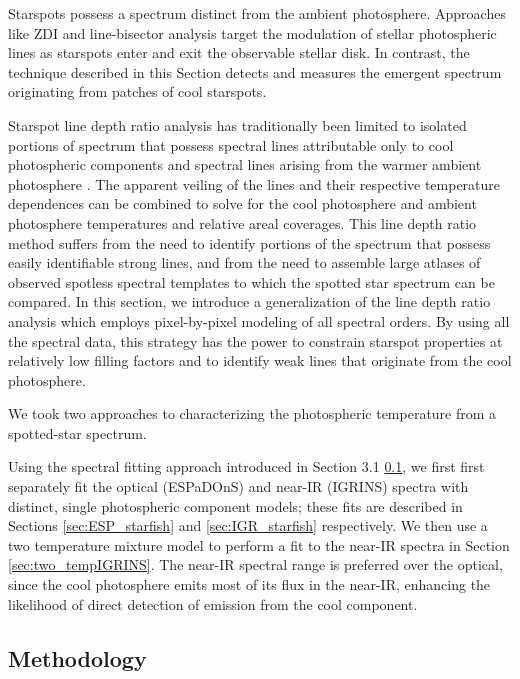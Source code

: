 \documentclass[twocolumn]{emulateapj}%
\begin{document}
Starspots possess a spectrum distinct from the ambient photosphere.  Approaches like ZDI and line-bisector analysis \citep[\emph{e.g.}][]{prato08, donati14} target the modulation of stellar photospheric lines as starspots enter and exit the observable stellar disk.  In contrast, the technique described in this Section detects and measures the emergent spectrum originating from patches of cool starspots.

Starspot line depth ratio analysis has traditionally been limited to isolated portions of spectrum that possess spectral lines attributable only to cool photospheric components and spectral lines arising from the warmer ambient photosphere \citep[\emph{e.g.}][]{neff95, oneal01}.  The apparent veiling of the lines and their respective temperature dependences can be combined to solve for the cool photosphere and ambient photosphere temperatures and relative areal coverages.  This line depth ratio method suffers from the need to identify portions of the spectrum that possess easily identifiable strong lines, and from the need to assemble large atlases of observed spotless spectral templates to which the spotted star spectrum can be compared.  In this section, we introduce a generalization of the line depth ratio analysis which employs pixel-by-pixel modeling of all spectral orders.  By using all the spectral data, this strategy has the power to constrain starspot properties at relatively low filling factors and to identify weak lines that originate from the cool photosphere.

We took two approaches to characterizing the photospheric temperature from a spotted-star spectrum.  

Using the spectral fitting approach introduced in Section 3.1 \ref{sec:methods}, we first first separately fit the optical (ESPaDOnS) and near-IR (IGRINS) spectra with distinct, single photospheric component models; these fits are described in Sections \ref{sec:ESP_starfish} and \ref{sec:IGR_starfish} respectively.  We then use a two temperature mixture model to perform a fit to the near-IR spectra in Section \ref{sec:two_tempIGRINS}.  The near-IR spectral range is preferred over the optical, since the cool photosphere emits most of its flux in the near-IR, enhancing the likelihood of direct detection of emission from the cool component.  


\subsection{Methodology}\label{sec:methods} 
\end{document}
